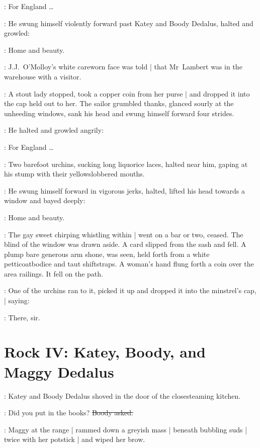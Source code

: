 \sailor:
For England \ldots

:
He swung himself violently forward past Katey and Boody Dedalus,
halted and growled:

\sailor:
Home and beauty.

\begin{interject}
    :
    J.J.~O'Molloy's white careworn face was told |
    that Mr~Lambert was in the warehouse with a visitor.
\end{interject}

:
A stout lady stopped,
took a copper coin from her purse |
and dropped it into the cap held out to her.
The sailor grumbled thanks,
glanced sourly at the unheeding windows,%
sank his head
and swung himself forward four strides.

:
He halted and growled angrily:

\sailor:
For England \ldots

:
Two barefoot urchins,
sucking long liquorice laces,
halted near him,
gaping at his stump with their yellowslobbered mouths.

:
He swung himself forward in vigorous jerks,
halted,
lifted his head towards a window
and bayed deeply:

\sailor:
Home and beauty.

:
The gay sweet chirping whistling within |
went on a bar or two, ceased.
The blind of the window was drawn aside.%
A card 
slipped from the sash and fell.
A plump bare generous arm shone,
was seen,
held forth from a white petticoatbodice and taut shiftstraps.
A woman's hand flung forth a coin
over the area railings.
It fell on the path.

:
One of the urchins ran to it,
picked it up and dropped it into the minstrel's cap, |
saying:

\boy:
There, sir.


\section*{Rock IV: Katey, Boody, and Maggy Dedalus}

:
Katey and Boody Dedalus shoved in the door
of the closesteaming kitchen.

\boody:
Did you put in the books?%
\sout{Boody asked.}

:
Maggy at the range |
rammed down a greyish mass |
beneath bubbling suds |
twice with her potstick |
and wiped her brow.

